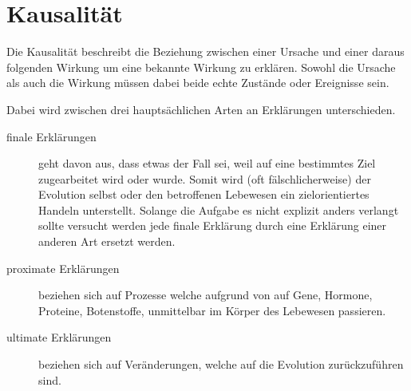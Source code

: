 \documentclass{article}
\begin{document}
\section{Kausalität}
Die Kausalität beschreibt die Beziehung zwischen einer Ursache und einer daraus folgenden Wirkung um eine bekannte Wirkung zu erklären. Sowohl die Ursache als auch die Wirkung müssen dabei beide echte Zustände oder Ereignisse sein.
 
Dabei wird zwischen drei hauptsächlichen Arten an Erklärungen unterschieden.
\begin{description} 
 \item[finale Erklärungen] geht davon aus, dass etwas der Fall sei, weil auf eine bestimmtes Ziel zugearbeitet wird oder wurde. Somit wird (oft fälschlicherweise) der Evolution selbst oder den betroffenen Lebewesen ein zielorientiertes Handeln unterstellt. Solange die Aufgabe es nicht explizit anders verlangt sollte versucht werden jede finale Erklärung durch eine Erklärung einer anderen Art ersetzt werden.
 \item[proximate Erklärungen] beziehen sich auf Prozesse welche aufgrund von auf Gene, Hormone, Proteine, Botenstoffe, unmittelbar im Körper des Lebewesen passieren.
 \item[ultimate Erklärungen] beziehen sich auf Veränderungen, welche auf die Evolution zurückzuführen sind.
\end{description} 
\end{document}
